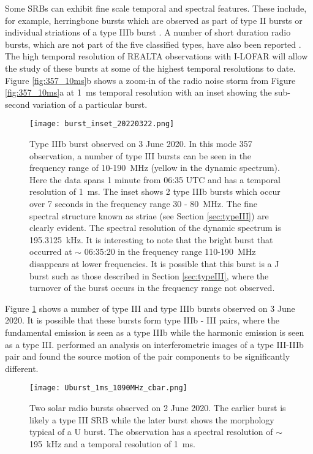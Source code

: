 Some SRBs can exhibit fine scale temporal and spectral features. These include, for example, herringbone bursts which are observed as part of type II bursts \citep[for example,][]{Carley2015} or individual striations of a type IIIb burst \citep[for example,][]{Zhang2020}. 
A number of short duration radio bursts, which are not part of the five classified types, have also been reported \citep[for example,][]{Ellis1967, Ellis1969, Melnik2010}. 
The high temporal resolution of REALTA observations with I-LOFAR will allow the study of these bursts at some of the highest temporal resolutions to date. Figure \ref{fig:357_10ms}b shows a zoom-in of the radio noise storm from Figure \ref{fig:357_10ms}a at 1~ms temporal resolution with an inset showing the sub-second variation of a particular burst.

\begin{figure}
    \centering
    \texttt{[image: burst\_inset\_20220322.png]}
    \caption[Type IIIb burst observed on 3 June 2020.]{Type IIIb burst observed on 3 June 2020. In this mode 357 observation, a number of type III bursts can be seen in the frequency range of 10-190~MHz (yellow in the dynamic spectrum). %
    Here the data spans 1 minute from 06:35 UTC and has a temporal resolution of 1~ms. The inset shows 2 type IIIb bursts which occur over 7 seconds in the frequency range 30 - 80~MHz. The fine spectral structure known as striae (see Section \ref{sec:typeIII}) are clearly evident. The spectral resolution of the dynamic spectrum is 195.3125~kHz. It is interesting to note that the bright burst that occurred at $\sim$ 06:35:20 in the frequency range 110-190~MHz disappears at lower frequencies. It is possible that this burst is a J burst such as those described in Section \ref{sec:typeIII}, where the turnover of the burst occurs in the frequency range not observed.}
    \label{fig:typeIIIb_realta}
\end{figure}

Figure \ref{fig:typeIIIb_realta} shows a number of type III and type IIIb bursts observed on 3 June 2020. It is possible that these bursts form type IIIb - III pairs, where the fundamental emission is seen as a type IIIb while the harmonic emission is seen as a type III. \cite{Zhang2020} performed an analysis on interferometric images of a type III-IIIb pair and found the source motion of the pair components to be significantly different.

\begin{figure}
    \centering
    \texttt{[image: Uburst\_1ms\_1090MHz\_cbar.png]}
    \caption[Two solar radio bursts observed on 2 June 2020.]{Two solar radio bursts observed on 2 June 2020. The earlier burst is likely a type III SRB while the later burst shows the morphology typical of a U burst. The observation has a spectral resolution of $\sim$ \SI{195}{\kilo \hertz} and a temporal resolution of \SI{1}{\milli \second}.}
    \label{fig:uburst}
\end{figure}

